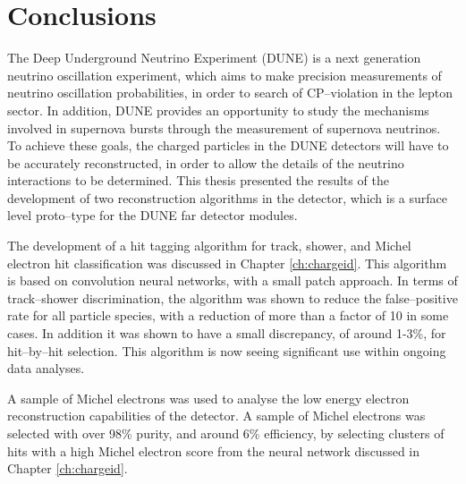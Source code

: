 \chapter{\label{ch:conclusions}Conclusions} 


\minitoc

The Deep Underground Neutrino Experiment (DUNE) is a next generation neutrino
oscillation experiment, which aims to make precision measurements of neutrino
oscillation probabilities, in order to search of CP--violation in the lepton
sector. In addition, DUNE provides an opportunity to study the mechanisms
involved in supernova bursts through the measurement of supernova neutrinos. 
To achieve these goals, the charged particles in the DUNE detectors will have to
be accurately reconstructed, in order to allow the details of the neutrino
interactions to be determined. This thesis presented the results of the
development of two reconstruction algorithms in the \protodune{} detector, which
is a surface level proto--type for the DUNE far detector modules. 

The development of a hit tagging algorithm for track, shower, and Michel
electron hit classification was discussed in Chapter \ref{ch:chargeid}. This 
algorithm is based on convolution neural networks, with a small patch 
approach. In terms of track--shower discrimination, the algorithm was shown 
to reduce the false--positive rate for all particle species, with a reduction 
of more than a factor of 10 in some cases. In addition it was shown to have a 
small discrepancy, of around 1-3\%, for hit--by--hit selection. This algorithm 
is now seeing significant use within ongoing \protodune{} data analyses. 


A sample of Michel electrons was used to analyse the low energy electron 
reconstruction capabilities of the \protodune{} detector. A sample of Michel
electrons was selected with over 98\% purity, and around 6\% efficiency, by
selecting clusters of hits with a high Michel electron score from the neural
network discussed in Chapter \ref{ch:chargeid}.  

